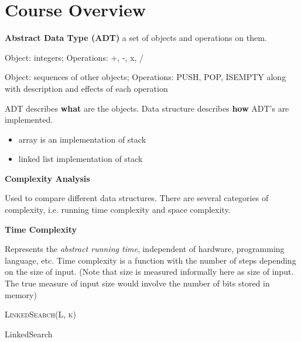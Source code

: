 \documentclass[11pt]{article}
\begin{document}

\section{Course Overview}


\textbf{Abstract Data Type (ADT)} a set of objects and operations on them.

\begin{example}
  Object: integers; Operations: +, -, x, /
\end{example}

\begin{example}
  Object: sequences of other objects; Operations: PUSH, POP, ISEMPTY along with description and effects of each operation
\end{example}

\begin{rem}
  ADT describes \textbf{what} are the objects. Data structure describes \textbf{how} ADT's are implemented.
  \begin{itemize}
    \item array is an implementation of stack
    \item linked list implementation of stack
  \end{itemize}
\end{rem}

$ $\\
\textbf{Complexity Analysis}

\begin{rem}
  Used to compare different data structures. There are several categories of complexity, i.e. running time complexity and space complexity.
\end{rem}

$ $\\
\textbf{Time Complexity}

\begin{rem}
  Represents the \textit{abstract running time}, independent of hardware, programming language, etc. Time complexity is a function with the number of steps depending on the size of input. (Note that size is measured informally here as size of input. The true measure of input size would involve the number of bits stored in memory)
\end{rem}

\begin{example}
  \textsc{LinkedSearch(L, k)}
\end{example}


\begin{algorithm}[H]
    \label{LinkedSearch Algorithm}
    \caption{LinkedSearch}
    \DontPrintSemicolon

\end{algorithm}
\end{document}
